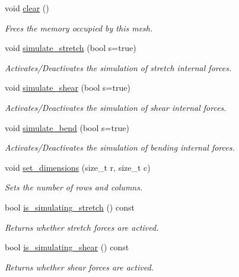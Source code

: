\begin{DoxyCompactItemize}
void \hyperlink{classphysim_1_1meshes_1_1mesh2d__regular_a6881e0701bdbbaf06f0502edfa8baac8}{clear} ()
\begin{DoxyCompactList}\small\item\em Frees the memory occupied by this mesh. \end{DoxyCompactList}\item 
void \hyperlink{classphysim_1_1meshes_1_1mesh2d__regular_a6d9ccf2226fb57cc3ffc04fd9612acdd}{simulate\+\_\+stretch} (bool s=true)
\begin{DoxyCompactList}\small\item\em Activates/\+Deactivates the simulation of stretch internal forces. \end{DoxyCompactList}\item 
void \hyperlink{classphysim_1_1meshes_1_1mesh2d__regular_a36293f6559978144527fb829efd63ea2}{simulate\+\_\+shear} (bool s=true)
\begin{DoxyCompactList}\small\item\em Activates/\+Deactivates the simulation of shear internal forces. \end{DoxyCompactList}\item 
void \hyperlink{classphysim_1_1meshes_1_1mesh2d__regular_abc94712fdb508f126934bd2bde2cf867}{simulate\+\_\+bend} (bool s=true)
\begin{DoxyCompactList}\small\item\em Activates/\+Deactivates the simulation of bending internal forces. \end{DoxyCompactList}\item 
void \hyperlink{classphysim_1_1meshes_1_1mesh2d__regular_aa8d8eafaea92619a04b3bd1781c8aec7}{set\+\_\+dimensions} (size\+\_\+t r, size\+\_\+t c)
\begin{DoxyCompactList}\small\item\em Sets the number of rows and columns. \end{DoxyCompactList}\item 
bool \hyperlink{classphysim_1_1meshes_1_1mesh2d__regular_ad1674ad6c5d8d3ed7ec01767f63f2de5}{is\+\_\+simulating\+\_\+stretch} () const
\begin{DoxyCompactList}\small\item\em Returns whether stretch forces are actived. \end{DoxyCompactList}\item 
bool \hyperlink{classphysim_1_1meshes_1_1mesh2d__regular_a1620fec743604c7a9dd8b8c81344b615}{is\+\_\+simulating\+\_\+shear} () const
\begin{DoxyCompactList}\small\item\em Returns whether shear forces are actived. \end{DoxyCompactList}\item 

\end{DoxyCompactItemize}
